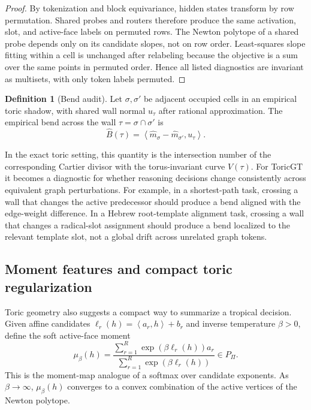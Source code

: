 \documentclass[11pt]{article}
\theoremstyle{definition}
\newtheorem{definition}{Definition}[section]
\theoremstyle{plain}
\theoremstyle{remark}
\numberwithin{equation}{section}
\newcommand{\ip}[2]{\left\langle #1,#2\right\rangle}
\begin{document}
\begin{proof}
By tokenization and block equivariance, hidden states transform by row permutation.  Shared probes and routers therefore produce the same activation, slot, and active-face labels on permuted rows.  The Newton polytope of a shared probe depends only on its candidate slopes, not on row order.  Least-squares slope fitting within a cell is unchanged after relabeling because the objective is a sum over the same points in permuted order.  Hence all listed diagnostics are invariant as multisets, with only token labels permuted.
\end{proof}

\begin{definition}[Bend audit]
Let $\sigma,\sigma'$ be adjacent occupied cells in an empirical toric shadow, with shared wall normal $u_{\tau}$ after rational approximation.  The empirical bend across the wall $\tau=\sigma\cap\sigma'$ is
\begin{equation}
  \widehat B(\tau)=\ip{\widehat m_\sigma-\widehat m_{\sigma'}}{u_\tau}.
\end{equation}
\end{definition}

In the exact toric setting, this quantity is the intersection number of the corresponding Cartier divisor with the torus-invariant curve $V(\tau)$.  For ToricGT it becomes a diagnostic for whether reasoning decisions change consistently across equivalent graph perturbations.  For example, in a shortest-path task, crossing a wall that changes the active predecessor should produce a bend aligned with the edge-weight difference.  In a Hebrew root-template alignment task, crossing a wall that changes a radical-slot assignment should produce a bend localized to the relevant template slot, not a global drift across unrelated graph tokens.

\subsection{Moment features and compact toric regularization}

Toric geometry also suggests a compact way to summarize a tropical decision.  Given affine candidates $\ell_r(h)=\ip{a_r}{h}+b_r$ and inverse temperature $\beta>0$, define the soft active-face moment
\begin{equation}
  \mu_\beta(h)=
  \frac{\sum_{r=1}^R \exp(\beta\ell_r(h))a_r}
       {\sum_{r=1}^R \exp(\beta\ell_r(h))}
  \in P_\Pi.
\end{equation}
This is the moment-map analogue of a softmax over candidate exponents.  As $\beta\to\infty$, $\mu_\beta(h)$ converges to a convex combination of the active vertices of the Newton polytope.
\end{document}
